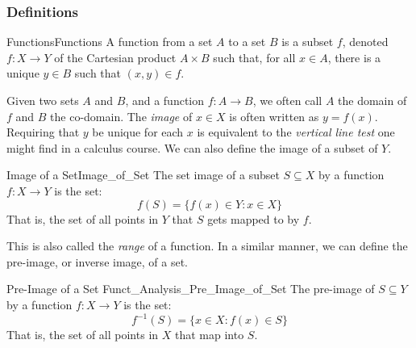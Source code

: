 \documentclass[crop=false,class=book,oneside]{standalone}
\begin{document}
            \subsubsection{Definitions}
                \begin{ldefinition}{Functions}{Functions}
                    A \gls{function} from a set $A$ to a set $B$
                    is a subset $f$, denoted $f:X\rightarrow{Y}$
                    of the Cartesian product $A\times{B}$
                    such that, for all $x\in{A}$, there is a unique
                    $y\in{B}$ such that $(x,y)\in{f}$.
                \end{ldefinition}
                Given two sets $A$ and $B$, and a function
                $f:A\rightarrow{B}$, we often call $A$ the
                domain of $f$ and $B$ the co-domain.
                The \textit{image} of $x\in{X}$ is often written
                as $y=f(x)$. Requiring that $y$ be unique for each
                $x$ is equivalent to the \textit{vertical line test}
                one might find in a calculus course. We can also
                define the image of a subset of $Y$.
                \begin{ldefinition}{Image of a Set}{Image_of_Set}
                    The \gls{set image} of a subset
                    $S\subseteq{X}$ by a function
                    $f:X\rightarrow{Y}$ is the set:
                    \begin{equation}
                        f(S)=\{f(x)\in{Y}:x\in{X}\}
                    \end{equation}
                    That is, the set of all points in $Y$ that $S$
                    gets mapped to by $f$.
                \end{ldefinition}
                This is also called the \textit{range} of a function.
                In a similar manner, we can define the pre-image, or
                inverse image, of a set.
                \begin{ldefinition}{Pre-Image of a Set}
                      {Funct_Analysis_Pre_Image_of_Set}
                    The \gls{pre-image} of $S\subseteq{Y}$
                    by a function $f:X\rightarrow{Y}$ is the set:
                    \begin{equation}
                        f^{\minus{1}}(S)=\{x\in{X}:f(x)\in{S}\}
                    \end{equation}
                    That is, the set of all points in $X$ that map
                    into $S$.
                \end{ldefinition}
\end{document}
